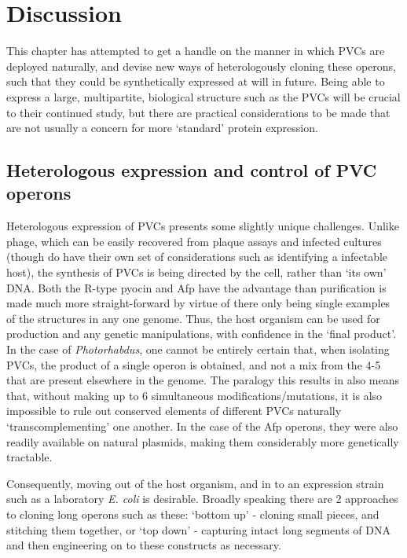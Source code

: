 \clearpage
\section{Discussion}

This chapter has attempted to get a handle on the manner in which PVCs are deployed naturally, and devise new ways of heterologously cloning these operons, such that they could be synthetically expressed at will in future. Being able to express a large, multipartite, biological structure such as the PVCs will be crucial to their continued study, but there are practical considerations to be made that are not usually a concern for more `standard' protein expression.

\subsection{Heterologous expression and control of PVC operons}
Heterologous expression of PVCs presents some slightly unique challenges. Unlike phage, which can be easily recovered from plaque assays and infected cultures (though do have their own set of considerations such as identifying a infectable host), the synthesis of PVCs is being directed by the cell, rather than `its own' DNA. Both the R-type pyocin and Afp have the advantage than purification is made much more straight-forward by virtue of there only being single examples of the structures in any one genome. Thus, the host organism can be used for production and any genetic manipulations, with confidence in the `final product'. In the case of \emph{Photorhabdus}, one cannot be entirely certain that, when isolating PVCs, the product of a single operon is obtained, and not a mix from the 4-5 that are present elsewhere in the genome. The paralogy this results in also means that, without making up to 6 simultaneous modifications/mutations, it is also impossible to rule out conserved elements of different PVCs naturally `transcomplementing' one another. In the case of the Afp operons, they were also readily available on natural plasmids, making them considerably more genetically tractable.

Consequently, moving out of the host organism, and in to an expression strain such as a laboratory \emph{E. coli} is desirable. Broadly speaking there are 2 approaches to cloning long operons such as these: `bottom up' - cloning small pieces, and stitching them together, or `top down' - capturing intact long segments of DNA and then engineering on to these constructs as necessary.

